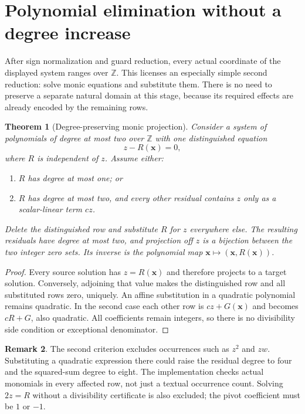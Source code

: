 \documentclass[11pt,letterpaper]{article}
\newtheorem{theorem}{Theorem}[section]
\theoremstyle{definition}
\newtheorem{remark}[theorem]{Remark}
\newcommand{\Z}{\mathbb Z}
\begin{document}
\section{Polynomial elimination without a degree increase}
\label{sec:elimination}

After sign normalization and guard reduction, every actual coordinate
of the displayed system ranges over $\Z$. This licenses an especially
simple second reduction: solve monic equations and substitute them.
There is no need to preserve a separate natural domain at this stage,
because its required effects are already encoded by the remaining rows.

\begin{theorem}[Degree-preserving monic projection]
\label{thm:elimination}
Consider a system of polynomials of degree at most two over $\Z$ with
one distinguished equation
\[
z-R(\boldsymbol x)=0,
\]
where $R$ is independent of $z$. Assume either:
\begin{enumerate}
\item $R$ has degree at most one; or
\item $R$ has degree at most two, and every other residual contains
    $z$ only as a scalar-linear term $cz$.
\end{enumerate}
Delete the distinguished row and substitute $R$ for $z$ everywhere
else. The resulting residuals have degree at most two, and projection
off $z$ is a bijection between the two integer zero sets. Its inverse
is the polynomial map $\boldsymbol x\mapsto(\boldsymbol x,R(\boldsymbol x))$.
\end{theorem}
\begin{proof}
Every source solution has $z=R(\boldsymbol x)$ and therefore projects
to a target solution. Conversely, adjoining that value makes the
distinguished row and all substituted rows zero, uniquely. An affine
substitution in a quadratic polynomial remains quadratic. In the
second case each other row is $cz+G(\boldsymbol x)$ and becomes
$cR+G$, also quadratic. All coefficients remain integers, so there is
no divisibility side condition or exceptional denominator.
\end{proof}

\begin{remark}
The second criterion excludes occurrences such as $z^2$ and $zw$.
Substituting a quadratic expression there could raise the residual
degree to four and the squared-sum degree to eight. The implementation
checks actual monomials in every affected row, not just a textual
occurrence count. Solving $2z=R$ without a divisibility certificate is
also excluded; the pivot coefficient must be $1$ or $-1$.
\end{remark}
\end{document}
